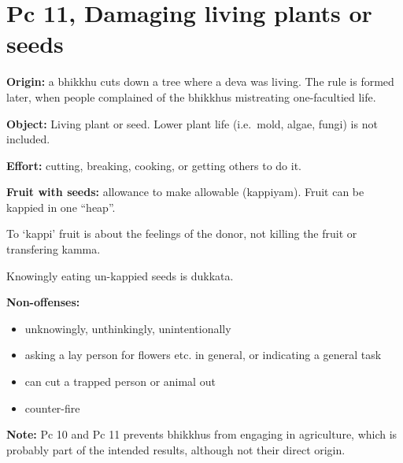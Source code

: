 \section{Pc 11, Damaging living plants or seeds}

\begin{multicols}{2}

\textbf{Origin:} a bhikkhu cuts down a tree where a deva was living. The
rule is formed later, when people complained of the bhikkhus mistreating
one-facultied life.

\textbf{Object:} Living plant or seed. Lower plant life (i.e.~mold,
algae, fungi) is not included.

\textbf{Effort:} cutting, breaking, cooking, or getting others to do it.

\textbf{Fruit with seeds:} allowance to make allowable (kappiyam). Fruit
can be kappied in one ``heap''.

\columnbreak

To `kappi' fruit is about the feelings of the donor, not killing the
fruit or transfering kamma.

Knowingly eating un-kappied seeds is dukkata.

\textbf{Non-offenses:}

\begin{itemize}
\tightlist
\item
  unknowingly, unthinkingly, unintentionally
\item
  asking a lay person for flowers etc. in general, or indicating a
  general task
\item
  can cut a trapped person or animal out
\item
  counter-fire
\end{itemize}

\end{multicols}

\enlargethispage{2\baselineskip}

\textbf{Note:} Pc 10 and Pc 11 prevents bhikkhus from engaging in
agriculture, which is probably part of the intended results, although
not their direct origin.

